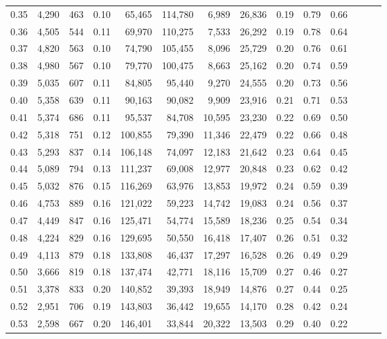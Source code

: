 \begin{tabular}{rrrrrrrrrrrrrr}
0.35 &  4,290 &  463 &  0.10 &   65,465 &  114,780 &   6,989 &  26,836 &  0.19 &  0.79 &      0.66 \\
0.36 &  4,505 &  544 &  0.11 &   69,970 &  110,275 &   7,533 &  26,292 &  0.19 &  0.78 &      0.64 \\
0.37 &  4,820 &  563 &  0.10 &   74,790 &  105,455 &   8,096 &  25,729 &  0.20 &  0.76 &      0.61 \\
0.38 &  4,980 &  567 &  0.10 &   79,770 &  100,475 &   8,663 &  25,162 &  0.20 &  0.74 &      0.59 \\
0.39 &  5,035 &  607 &  0.11 &   84,805 &   95,440 &   9,270 &  24,555 &  0.20 &  0.73 &      0.56 \\
0.40 &  5,358 &  639 &  0.11 &   90,163 &   90,082 &   9,909 &  23,916 &  0.21 &  0.71 &      0.53 \\
0.41 &  5,374 &  686 &  0.11 &   95,537 &   84,708 &  10,595 &  23,230 &  0.22 &  0.69 &      0.50 \\
0.42 &  5,318 &  751 &  0.12 &  100,855 &   79,390 &  11,346 &  22,479 &  0.22 &  0.66 &      0.48 \\
0.43 &  5,293 &  837 &  0.14 &  106,148 &   74,097 &  12,183 &  21,642 &  0.23 &  0.64 &      0.45 \\
0.44 &  5,089 &  794 &  0.13 &  111,237 &   69,008 &  12,977 &  20,848 &  0.23 &  0.62 &      0.42 \\
0.45 &  5,032 &  876 &  0.15 &  116,269 &   63,976 &  13,853 &  19,972 &  0.24 &  0.59 &      0.39 \\
0.46 &  4,753 &  889 &  0.16 &  121,022 &   59,223 &  14,742 &  19,083 &  0.24 &  0.56 &      0.37 \\
0.47 &  4,449 &  847 &  0.16 &  125,471 &   54,774 &  15,589 &  18,236 &  0.25 &  0.54 &      0.34 \\
0.48 &  4,224 &  829 &  0.16 &  129,695 &   50,550 &  16,418 &  17,407 &  0.26 &  0.51 &      0.32 \\
0.49 &  4,113 &  879 &  0.18 &  133,808 &   46,437 &  17,297 &  16,528 &  0.26 &  0.49 &      0.29 \\
0.50 &  3,666 &  819 &  0.18 &  137,474 &   42,771 &  18,116 &  15,709 &  0.27 &  0.46 &      0.27 \\
0.51 &  3,378 &  833 &  0.20 &  140,852 &   39,393 &  18,949 &  14,876 &  0.27 &  0.44 &      0.25 \\
0.52 &  2,951 &  706 &  0.19 &  143,803 &   36,442 &  19,655 &  14,170 &  0.28 &  0.42 &      0.24 \\
0.53 &  2,598 &  667 &  0.20 &  146,401 &   33,844 &  20,322 &  13,503 &  0.29 &  0.40 &      0.22 \\

\end{tabular}
